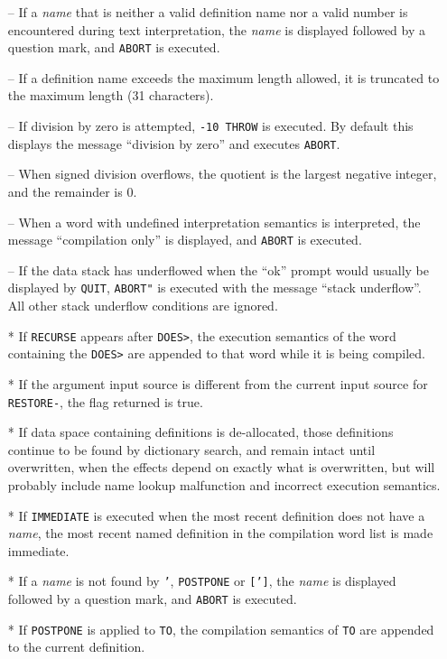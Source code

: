 \documentclass[english]{article}
\begin{document}
\begin{itemize}
\item[--]If a \textit{name} that is neither a valid definition name nor a valid number is encountered during text interpretation, the \textit{name} is displayed followed by a question mark, and {\tt ABORT} is executed.
\item[--]If a definition name exceeds the maximum length allowed, it is truncated to the maximum length (31 characters).
\item[--]If division by zero is attempted, {\tt -10 THROW} is executed. By default this displays the message ``division by zero'' and executes {\tt ABORT}.
\item[--]When signed division overflows, the quotient is the largest negative integer, and the remainder is $0$.
\item[--]When a word with undefined interpretation semantics is interpreted, the message ``compilation only'' is displayed, and {\tt ABORT} is executed.
\item[--]If the data stack has underflowed when the ``ok'' prompt would usually be displayed by {\tt QUIT}, {\tt ABORT"} is executed with the message ``stack underflow''. All other stack underflow conditions are ignored.
\item[*]If {\tt RECURSE} appears after {\tt DOES>}, the execution semantics of the word containing the {\tt DOES>} are appended to that word while it is being compiled.
\item[*]If the argument input source is different from the current input source for {\tt RESTORE-}, the flag returned is true.
\item[*]If data space containing definitions is de-allocated, those definitions continue to be found by dictionary search, and remain intact until overwritten, when the effects depend on exactly what is overwritten, but will probably include name lookup malfunction and incorrect execution semantics.
\item[*]If {\tt IMMEDIATE} is executed when the most recent definition does not have a \textit{name}, the most recent named definition in the compilation word list is made immediate.
\item[*]If a \textit{name} is not found by {\tt '}, {\tt POSTPONE} or {\tt [']}, the \textit{name} is displayed followed by a question mark, and {\tt ABORT} is executed.
\item[*]If {\tt POSTPONE} is applied to {\tt TO}, the compilation semantics of {\tt TO} are appended to the current definition.
\end{itemize}
\end{document}

